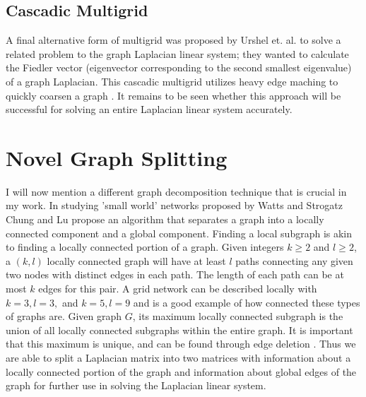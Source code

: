 \documentclass{article}
\begin{document}
\subsection{Cascadic Multigrid}
A final alternative form of multigrid was proposed by Urshel et. al. to solve a related problem to the graph Laplacian linear system; they wanted to calculate the Fiedler vector (eigenvector corresponding to the second smallest eigenvalue) of a graph Laplacian. This cascadic multigrid utilizes heavy edge maching to quickly coarsen a graph \cite{Urschel:2014}. It remains to be seen whether this approach will be successful for solving an entire Laplacian linear system accurately.



\section{Novel Graph Splitting}
I will now mention a different graph decomposition technique that is crucial in my work. In studying 'small world' networks proposed by Watts and Strogatz \cite{Watts:1998} Chung and Lu propose an algorithm that separates a graph into a locally connected component and a global component. Finding a local subgraph is akin to finding a locally connected portion of a graph. Given integers $k \geq 2$ and $l \geq 2$, a $(k,l)$ locally connected graph will have at least $l$ paths connecting any given two nodes with distinct edges in each path. The length of each path can be at most $k$ edges for this pair. A grid network can be described locally with $k=3, l=3,$ and $k=5, l=9$ and is a good example of how connected these types of graphs are. Given graph $G$, its maximum locally connected subgraph is the union of all locally connected subgraphs within the entire graph. It is important that this maximum is unique, and can be found through edge deletion \cite{Chung:2004}. Thus we are able to split a Laplacian matrix into two matrices with information about a locally connected portion of the graph and information about global edges of the graph for further use in solving the Laplacian linear system.





\end{document}
